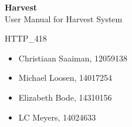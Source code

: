 \documentclass[11pt,fleqn]{book} %
\begin{document}

\begingroup
\thispagestyle{empty}
\centering
\vspace*{5cm}
\par\normalfont\fontsize{35}{35}\sffamily\selectfont
\textbf{Harvest}\\
{\LARGE User Manual for Harvest System}\par %
\vspace*{0.5cm}
{\Huge HTTP\_418}\par
\centering
\vspace*{0.5cm}
\begin{itemize}[label={}, noitemsep]	
		\Large
		\item \begin{center} Christiaan Saaiman, 12059138 \end{center}
		\item \begin{center} Michael Loosen, 14017254 \end{center}
		\item \begin{center} Elizabeth Bode, 14310156 \end{center}
		\item \begin{center} LC Meyers, 14024633 \end{center}	
\end{itemize}
\endgroup



\pagestyle{empty} %

\tableofcontents %


\pagestyle{fancy} %

\end{document}
